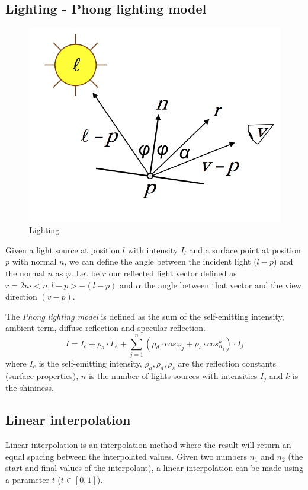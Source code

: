 
\subsection{Lighting - Phong lighting model}

\begin{figure}[h!]
  \centering
  \includegraphics[scale=0.6]{images/lighting}
\caption{Lighting \cite{SLIDE:ICORSI}}
\end{figure}
Given a light source at position $l$ with intensity $I_l$ and a surface point at position $p$ with normal $n$,
we can define the angle between the incident light ($l-p$) and the normal $n$ as $\varphi$.
Let be $r$ our reflected light vector defined as $r = 2 n \cdot <n, l - p> - (l-p)$ and $\alpha$ the angle between that vector and the view direction $(v - p)$.

The \textit{Phong lighting model} is defined as the sum of the self-emitting intensity, ambient term, diffuse reflection and specular reflection.
$$ I = I_e + {\rho}_a \cdot I_A + \sum_{j=1}^n ({\rho}_d \cdot cos {\varphi}_j + {\rho}_s \cdot cos_{\alpha_j}^k) \cdot I_j$$ where $I_e$ is the self-emitting intensity, ${\rho}_a, {\rho}_d, {\rho}_s$ are the reflection constants (surface properties), $n$ is the number of lights sources with intensities $I_j$ and $k$ is the shininess.
\cite{SLIDE:ICORSI}


\subsection{Linear interpolation}
Linear interpolation is an interpolation method where the result will return an equal spacing between the interpolated values. Given two numbers $n_1$ and $n_2$ (the start and final values of the interpolant), a linear interpolation can be made using a parameter $t$ ($t \in [0,1]$). \cite{WEBSITE:interpolation}

